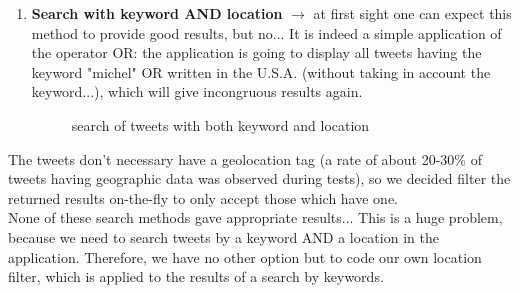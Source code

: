 \documentclass[a4paper,11pt]{report}
\begin{document}
\begin{enumerate}
	\item \textbf{Search with keyword AND location} $\to$ at first sight one can expect this method to provide good results, but no... It is indeed a simple application of the operator OR: the application is going to display all tweets having the keyword "michel" OR written in the U.S.A. (without taking in account the keyword...), which will give incongruous results again.
	\begin{figure}[H]
	\vspace{-5pt}
	\begin{center}
	\vspace{-5pt}
	\caption{search of tweets with both keyword and location}
	\end{center}
	\end{figure}
\end{enumerate}

The tweets don't necessary have a geolocation tag (a rate of about 20-30\% of tweets having geographic data was observed during tests), so we decided filter the returned results on-the-fly to only accept those which have one.\\

None of these search methods gave appropriate results... This is a huge problem, because we need to search tweets by a keyword AND a location in the application. Therefore, we have no other option but to code our own location filter, which is applied to the results of a search by keywords.\\
\end{document}
